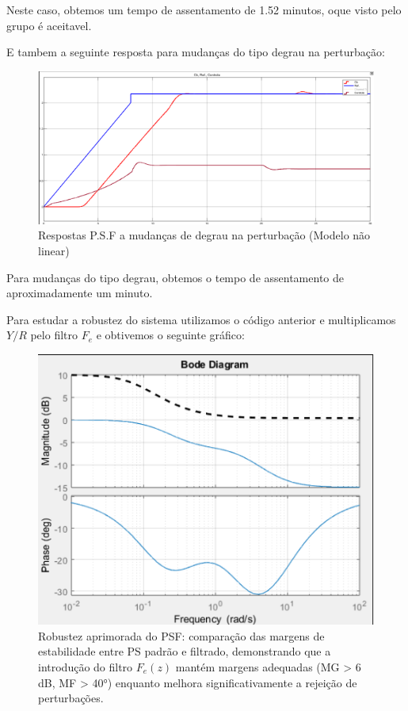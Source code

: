 \documentclass[a4paper,12pt]{article}
\begin{document}
Neste caso, obtemos um tempo de assentamento de 1.52 minutos, oque visto pelo grupo é aceitavel.

E tambem a seguinte resposta para mudanças do tipo degrau na perturbação:

\begin{figure} [H]
    \centering
    \includegraphics[width=0.9\linewidth]{image8.png}
    \caption{Respostas P.S.F a mudanças de degrau na perturbação (Modelo não linear)}
    \label{fig:psf_nonlinear_disturbance_response}
\end{figure}

Para mudanças do tipo degrau, obtemos o tempo de assentamento de
aproximadamente um minuto.


Para estudar a robustez do sistema utilizamos o código anterior e multiplicamos $Y/R$ pelo filtro $F_e$ e obtivemos o seguinte gráfico:


\begin{figure} [H]
    \centering
    \includegraphics[width=0.6\linewidth]{image9.png}
    \caption{Robustez aprimorada do PSF: comparação das margens de estabilidade entre PS padrão e filtrado, demonstrando que a introdução do filtro $F_e(z)$ mantém margens adequadas (MG > 6 dB, MF > 40°) enquanto melhora significativamente a rejeição de perturbações.}
    \label{fig:psf_robustness_analysis}
\end{figure}
\end{document}
